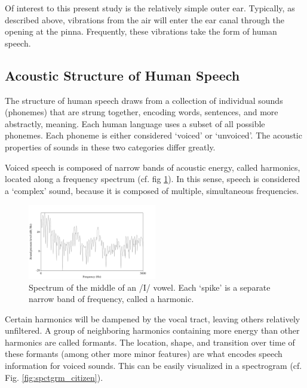 \documentclass[dissertation,copyright]{uathesis}
\begin{document}
Of interest to this present study is the relatively simple outer ear.  Typically, as described above, vibrations from the air will enter the ear canal through the opening at the pinna. Frequently, these vibrations take the form of human speech.



\subsection{Acoustic Structure of Human Speech}

The structure of human speech draws from a collection of individual sounds (phonemes) that are strung together, encoding words, sentences, and more abstractly, meaning.  Each human language uses a subset of all possible phonemes.  Each phoneme is either considered `voiced' or `unvoiced'.  The acoustic properties of sounds in these two categories differ greatly.

Voiced speech is composed of narrow bands of acoustic energy, called harmonics, located along a frequency spectrum (cf. fig \ref{fig:spctrm5k}).  In this sense, speech is considered a `complex' sound, because it is composed of multiple, simultaneous frequencies.
%
\begin{figure}
\centering
  \includegraphics[width=0.5\textwidth]{figure/spctrm5k.png}
  \caption{Spectrum of the middle of an /I/ vowel.  Each `spike' is a separate narrow band of frequency, called a harmonic.}
  \label{fig:spctrm5k}
\end{figure}
%
Certain harmonics will be dampened by the vocal tract, leaving others relatively unfiltered.  A group of neighboring harmonics containing more energy than other harmonics are called formants.  The location, shape, and transition over time of these formants (among other more minor features) are what encodes speech information for voiced sounds.  This can be easily visualized in a spectrogram (cf. Fig. \ref{fig:spctgrm_citizen}).
\end{document}
